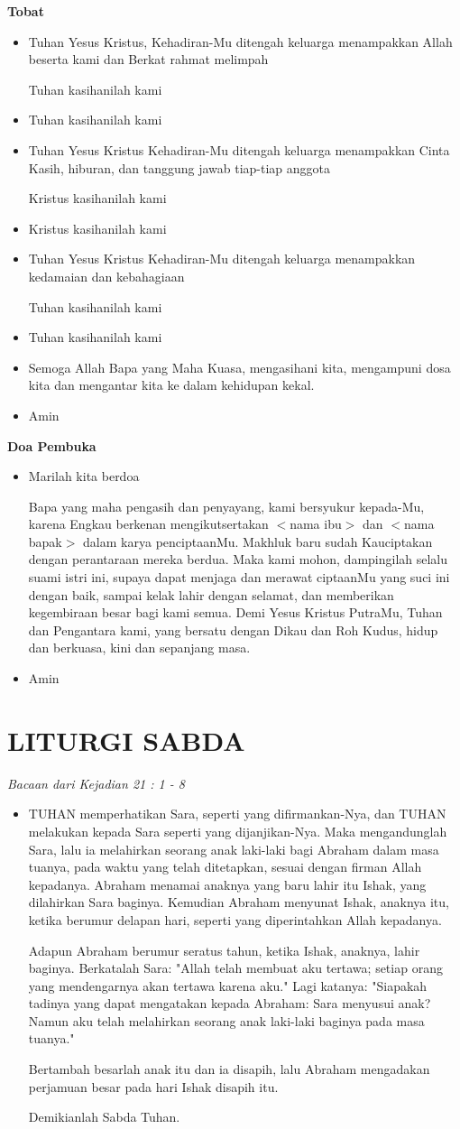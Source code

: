 \documentclass[a5paper,headsepline,titlepage,10pt,nnormalheadings,DIVcalc,twoside]{scrbook}
\makeatletter
\newcommand{\subjudul}[1]{%
  {\parindent \z@ 
    \interlinepenalty\@M \bfseries #1\par\nobreak \vskip 10\p@ }}
\newcommand{\keterangan}[1]{%
  {\parindent \z@  \slshape 
    \interlinepenalty\@M \textsl{#1}\par\nobreak  \vskip 5\p@}}
\newcommand{\BU}[1]{\begin{itemize} \item[U:] #1 \end{itemize}}
\newcommand{\BP}[1]{\begin{itemize} \item[P:] #1 \end{itemize}}
\newcommand{\namaibu}{$<$nama ibu$>$ }
\newcommand{\namabapak}{$<$nama bapak$>$ }
\makeatother
\begin{document}
 

\subjudul{Tobat}

\BP{Tuhan Yesus Kristus, 
Kehadiran-Mu ditengah keluarga menampakkan Allah beserta kami dan Berkat rahmat melimpah

Tuhan kasihanilah kami}
\BU{Tuhan kasihanilah kami}

\BP{Tuhan Yesus Kristus
Kehadiran-Mu ditengah keluarga menampakkan Cinta Kasih, hiburan, dan tanggung jawab tiap-tiap anggota

Kristus kasihanilah kami}
\BU{Kristus kasihanilah kami}

\BP{Tuhan Yesus Kristus
Kehadiran-Mu ditengah keluarga menampakkan kedamaian dan kebahagiaan

Tuhan kasihanilah kami}
\BU{Tuhan kasihanilah kami}

\BP{Semoga Allah Bapa yang Maha Kuasa, mengasihani kita, 
mengampuni dosa kita dan mengantar kita ke dalam 
kehidupan kekal.}

\BU{Amin}

 

\subjudul{Doa Pembuka}

\BP{Marilah kita berdoa 

Bapa yang maha pengasih dan penyayang, kami bersyukur kepada-Mu, karena Engkau berkenan mengikutsertakan \namaibu dan \namabapak dalam karya penciptaanMu. Makhluk baru sudah Kauciptakan dengan perantaraan mereka berdua. Maka kami mohon, dampingilah selalu suami istri ini, supaya dapat menjaga dan merawat ciptaanMu yang suci ini dengan baik, sampai kelak lahir dengan selamat, dan memberikan kegembiraan besar bagi kami semua. Demi Yesus Kristus PutraMu, Tuhan dan Pengantara kami, yang bersatu dengan Dikau dan Roh Kudus, hidup dan berkuasa, kini dan sepanjang masa.}

\BU{Amin}

 

\section*{LITURGI SABDA} 

\keterangan{Bacaan dari Kejadian 21 : 1 - 8}

\BP{TUHAN memperhatikan Sara, seperti yang difirmankan-Nya, dan TUHAN melakukan kepada Sara seperti yang dijanjikan-Nya.
Maka mengandunglah Sara, lalu ia melahirkan seorang anak laki-laki bagi Abraham dalam masa tuanya, pada waktu yang telah ditetapkan, sesuai dengan firman Allah kepadanya.
Abraham menamai anaknya yang baru lahir itu Ishak, yang dilahirkan Sara baginya.
Kemudian Abraham menyunat Ishak, anaknya itu, ketika berumur delapan hari, seperti yang diperintahkan Allah kepadanya.

Adapun Abraham berumur seratus tahun, ketika Ishak, anaknya, lahir baginya.
Berkatalah Sara: "Allah telah membuat aku tertawa; setiap orang yang mendengarnya akan tertawa karena aku."
Lagi katanya: "Siapakah tadinya yang dapat mengatakan kepada Abraham: Sara menyusui anak? Namun aku telah melahirkan seorang anak laki-laki baginya pada masa tuanya."

Bertambah besarlah anak itu dan ia disapih, lalu Abraham mengadakan perjamuan besar pada hari Ishak disapih itu.

Demikianlah Sabda Tuhan.}
\end{document}
